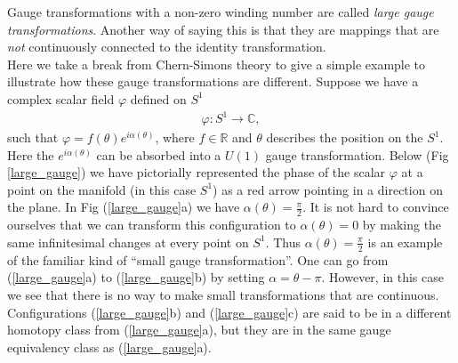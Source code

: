     Gauge transformations with a non-zero winding number are called \textit{large gauge transformations}. Another way of saying this is that they are mappings that are \textit{not} continuously connected to the identity transformation. \\
    \indent Here we take a break from Chern-Simons theory to give a simple example to illustrate how these gauge transformations are different. Suppose we have a complex scalar field $\varphi$ defined on  $S^1$
    \begin{align}
        \varphi: S^1 \rightarrow \mathbb{C},
    \end{align}
    such that $\varphi = f(\theta) e^{i \alpha(\theta)}$, where $f\in \mathbb{R}$ and $\theta$ describes the position on the $S^1$. Here the $e ^{i \alpha (\theta)}$ can be absorbed into a $U(1)$ gauge transformation. Below (Fig \ref{large_gauge}) we have pictorially represented the phase of the scalar $\varphi$ at a point on the manifold (in this case $S^1$) as a red arrow pointing in a direction on the plane. In Fig (\ref{large_gauge}a) we have $\alpha(\theta) = \frac{\pi}{2}$. It is not hard to convince ourselves that we can transform this configuration to $\alpha(\theta) =0$ by making the same infinitesimal changes at every point on $S^1$. Thus $\alpha(\theta) = \frac{\pi}{2}$ is an example of the familiar kind of ``small gauge transformation''. One can go from (\ref{large_gauge}a) to (\ref{large_gauge}b) by setting $\alpha =\theta - \pi$. However, in this case we see that there is no way to make small transformations that are continuous. Configurations (\ref{large_gauge}b) and (\ref{large_gauge}c) are said to be in a different homotopy class from (\ref{large_gauge}a), but they are in the same gauge equivalency class as (\ref{large_gauge}a).
    


